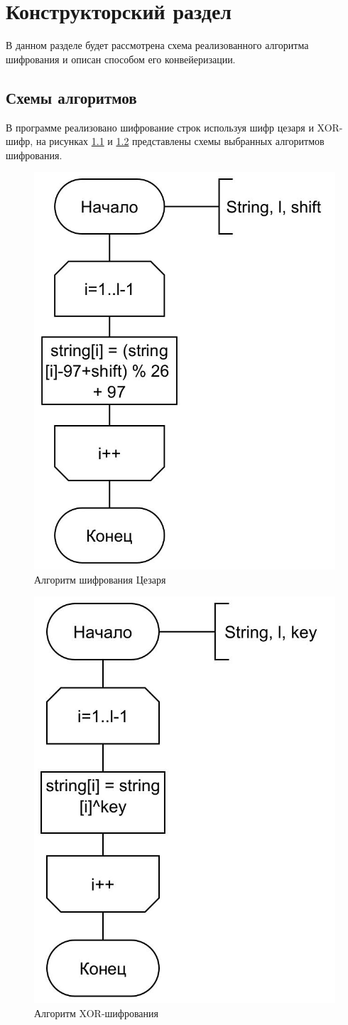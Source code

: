 \chapter{Конструкторский раздел}
\label{cha:design}
В данном разделе будет рассмотрена схема реализованного алгоритма шифрования и описан способом его конвейеризации.

\section{Схемы алгоритмов}
В программе реализовано шифрование строк используя шифр цезаря и XOR-шифр, на рисунках \ref{fig:caesar} и \ref{fig:xor} представлены схемы выбранных алгоритмов шифрования.
\begin{figure}[H]
	\centering
	\includegraphics[width=0.5\linewidth]{src/caesar}
	\caption{Алгоритм шифрования Цезаря}
	\label{fig:caesar}
\end{figure}
\begin{figure}[H]
	\centering
	\includegraphics[width=0.5\linewidth]{src/xor}
	\caption{Алгоритм XOR-шифрования}
	\label{fig:xor}
\end{figure}

